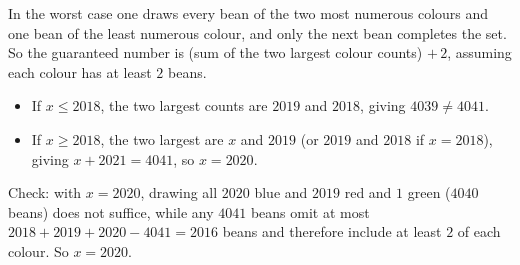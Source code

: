 In the worst case one draws every bean of the two most numerous colours and one bean of the least numerous colour, and only the next bean completes the set. So the guaranteed number is (sum of the two largest colour counts) \(+\,2\), assuming each colour has at least \(2\) beans.
\begin{itemize}
\item If \(x\le 2018\), the two largest counts are \(2019\) and \(2018\), giving \(4039\ne 4041\).
\item If \(x\ge 2018\), the two largest are \(x\) and \(2019\) (or \(2019\) and \(2018\) if \(x=2018\)), giving \(x+2021=4041\), so \(x=2020\).
\end{itemize}
Check: with \(x=2020\), drawing all \(2020\) blue and \(2019\) red and \(1\) green (\(4040\) beans) does not suffice, while any \(4041\) beans omit at most \(2018+2019+2020-4041=2016\) beans and therefore include at least \(2\) of each colour. So \(x=\boxed{2020}\).
